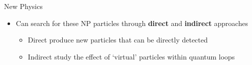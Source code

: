 \documentclass[aspectratio=1610]{beamer}
\begin{document}
\begin{frame}{New Physics}
\bigskip

\begin{itemize}
\item Can search for these NP particles through {\bf direct} and {\bf indirect} approaches
   \begin{itemize}
     \item Direct \to produce new particles that can be directly detected
     \item Indirect \to study the effect of `virtual' particles within quantum loops
   \end{itemize}
\end{itemize}

\end{frame}


\end{document}
